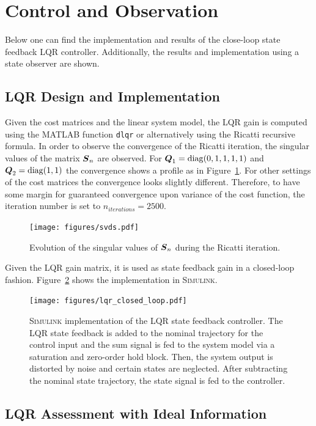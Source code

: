 
\section{Control and Observation}
Below one can find the implementation and results of the close-loop state feedback LQR controller.
Additionally, the results and implementation using a state observer are shown.

\subsection{LQR Design and Implementation}
Given the cost matrices and the linear system model, the LQR gain is computed using the MATLAB function \texttt{dlqr} or alternatively using the Ricatti recursive formula.
In order to observe the convergence of the Ricatti iteration, the singular values of the matrix $\boldsymbol{S}_n$ are observed.
For $\boldsymbol{Q}_1 = \mathop{\mathrm{diag}} (0, 1, 1, 1, 1)$ and $\boldsymbol{Q}_2 = \mathop{\mathrm{diag}} (1, 1)$ the convergence shows a profile as in Figure~\ref{fig:ricatti_svds}.
For other settings of the cost matrices the convergence looks slightly different.
Therefore, to have some margin for guaranteed convergence upon variance of the cost function, the iteration number is set to $n_{iterations} = 2500$.

\begin{figure}[h]
	\centering
	\texttt{[image: figures/svds.pdf]}
	\caption{Evolution of the singular values of $\boldsymbol{S}_n$ during the Ricatti iteration.}
	\label{fig:ricatti_svds}
\end{figure}

Given the LQR gain matrix, it is used as state feedback gain in a closed-loop fashion.
Figure~\ref{fig:lqr_closed} shows the implementation in \textsc{Simulink}.

\begin{figure}[h!]
	\centering
	\texttt{[image: figures/lqr\_closed\_loop.pdf]}
	\caption{\textsc{Simulink} implementation of the LQR state feedback controller. The LQR state feedback is added to the nominal trajectory for the control input and the sum signal is fed to the system model via a saturation and zero-order hold block. Then, the system output is distorted by noise and certain states are neglected. After subtracting the nominal state trajectory, the state signal is fed to the controller.}
	\label{fig:lqr_closed}
\end{figure}

\subsection{LQR Assessment with Ideal Information}

